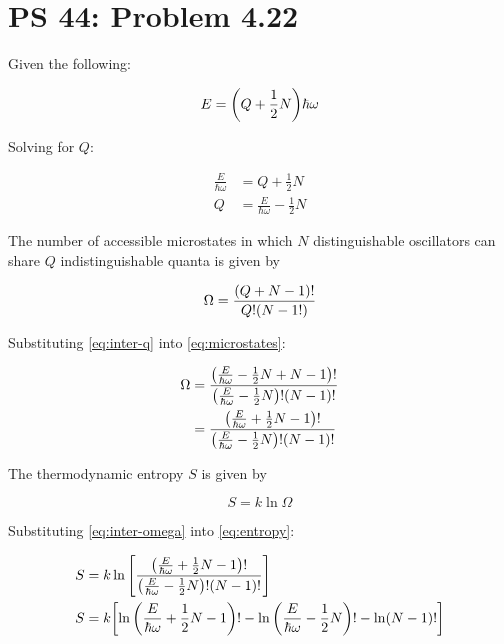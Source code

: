 \documentclass[12pt,a4paper]{article}
\begin{document}
\setcounter{page}{1}

\section*{PS 44: Problem 4.22}
\bigskip

Given the following:

\begin{equation}
	E = \qty(Q + \frac{1}{2}N)\hbar\omega \label{eq:given-e}
\end{equation}

Solving for $Q$:

\begin{align}
	\frac{E}{\hbar\omega} &= Q + \frac{1}{2}N \\
	Q &= \frac{E}{\hbar\omega} - \frac{1}{2}N \label{eq:inter-q}
\end{align}

The number of accessible microstates in which $N$ distinguishable oscillators can share $Q$ indistinguishable quanta is given by

\begin{equation}
	\Omega = \frac{\qty(Q+N-1)!}{Q!\qty(N-1!)} \label{eq:microstates}
\end{equation}

Substituting \eqref{eq:inter-q} into \eqref{eq:microstates}:

\begin{align}
	\Omega &= \frac{\qty(\frac{E}{\hbar\omega} - \frac{1}{2}N + N - 1)!}{\qty(\frac{E}{\hbar\omega} - \frac{1}{2}N)! \qty(N-1)!} \\
	&= \frac{\qty(\frac{E}{\hbar\omega} + \frac{1}{2}N -1)!}{\qty(\frac{E}{\hbar\omega} - \frac{1}{2}N)!(N-1)!} \label{eq:inter-omega}
\end{align}

The thermodynamic entropy $S$ is given by

\begin{equation}
	S = k\ln\Omega \label{eq:entropy}
\end{equation}

Substituting \eqref{eq:inter-omega} into \eqref{eq:entropy}:

\begin{align}
	S &= k\ln\qty[\frac{\qty(\frac{E}{\hbar\omega} + \frac{1}{2}N -1)!}{\qty(\frac{E}{\hbar\omega} - \frac{1}{2}N)!(N-1)!}]\\
    S &= k\qty[\ln\qty(\frac{E}{\hbar\omega} + \frac{1}{2}N -1)!-\ln\qty(\frac{E}{\hbar\omega} - \frac{1}{2}N)! - \ln(N-1)!] \label{eq:inter-s}
\end{align}
\end{document}
